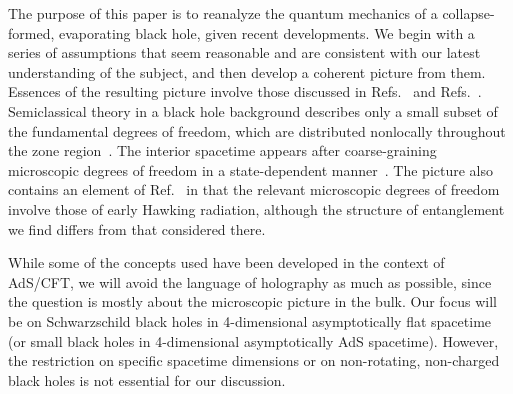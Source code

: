 \documentclass[12pt]{article}
\begin{document}
The purpose of this paper is to reanalyze the quantum mechanics of a 
collapse-formed, evaporating black hole, given recent developments. 
We begin with a series of assumptions that seem reasonable and 
are consistent with our latest understanding of the subject, and 
then develop a coherent picture from them.  Essences of the resulting 
picture involve those discussed in Refs.~\cite{Nomura:2014woa,%
Nomura:2014voa,Nomura:2016qum} and Refs.~\cite{Papadodimas:2012aq,%
Papadodimas:2013jku,Papadodimas:2015jra}.  Semiclassical theory 
in a black hole background describes only a small subset of the 
fundamental degrees of freedom, which are distributed nonlocally 
throughout the zone region~\cite{Nomura:2014woa,Nomura:2014voa,%
Nomura:2016qum}.  The interior spacetime appears after 
coarse-graining microscopic degrees of freedom in a state-dependent 
manner~\cite{Papadodimas:2012aq,Papadodimas:2013jku,%
Papadodimas:2015jra}.  The picture also contains an element 
of Ref.~\cite{Maldacena:2013xja} in that the relevant microscopic 
degrees of freedom involve those of early Hawking radiation, 
although the structure of entanglement we find differs from 
that considered there.

While some of the concepts used have been developed in the context 
of AdS/CFT, we will avoid the language of holography as much as 
possible, since the question is mostly about the microscopic picture 
in the bulk.  Our focus will be on Schwarzschild black holes in 
4-dimensional asymptotically flat spacetime (or small black holes 
in 4-dimensional asymptotically AdS spacetime).  However, the 
restriction on specific spacetime dimensions or on non-rotating, 
non-charged black holes is not essential for our discussion.
\end{document}
